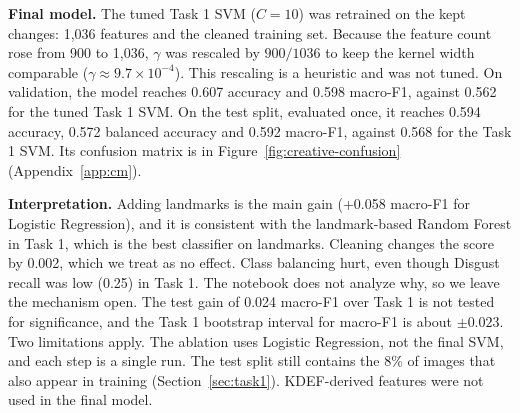 \textbf{Final model.} The tuned Task 1 SVM ($C = 10$) was retrained on the kept changes: 1,036 features and the cleaned training set. Because the feature count rose from 900 to 1,036, $\gamma$ was rescaled by $900/1036$ to keep the kernel width comparable ($\gamma \approx 9.7\times10^{-4}$). This rescaling is a heuristic and was not tuned. On validation, the model reaches 0.607 accuracy and 0.598 macro-F1, against 0.562 for the tuned Task 1 SVM. On the test split, evaluated once, it reaches 0.594 accuracy, 0.572 balanced accuracy and 0.592 macro-F1, against 0.568 for the Task 1 SVM. Its confusion matrix is in Figure~\ref{fig:creative-confusion} (Appendix~\ref{app:cm}).

\textbf{Interpretation.} Adding landmarks is the main gain (+0.058 macro-F1 for Logistic Regression), and it is consistent with the landmark-based Random Forest in Task 1, which is the best classifier on landmarks. Cleaning changes the score by 0.002, which we treat as no effect. Class balancing hurt, even though Disgust recall was low (0.25) in Task 1. The notebook does not analyze why, so we leave the mechanism open. The test gain of 0.024 macro-F1 over Task 1 is not tested for significance, and the Task 1 bootstrap interval for macro-F1 is about $\pm0.023$. Two limitations apply. The ablation uses Logistic Regression, not the final SVM, and each step is a single run. The test split still contains the 8\% of images that also appear in training (Section~\ref{sec:task1}). KDEF-derived features were not used in the final model.